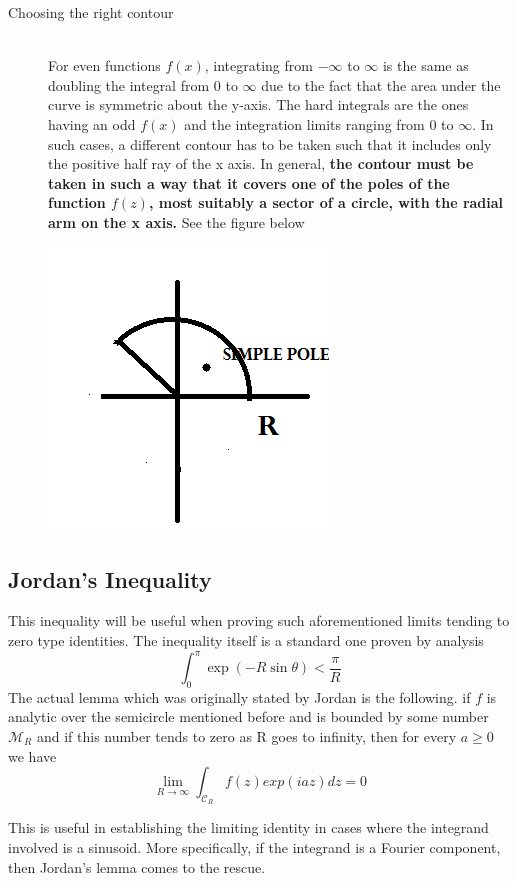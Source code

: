 \documentclass[11pt]{article}
\begin{document}
\begin{sloppypar}
\begin{description}
\item[Choosing the right contour] \hfill \\
	For even functions $f(x)$, integrating from $-\infty$ to $\infty$ is the same as doubling the integral from $0$ to $\infty$ due to the fact that the area under the curve is symmetric about the y-axis. The hard integrals are the ones having an odd $f(x)$ and the integration limits ranging from $0$ to $\infty$. In such cases, a different contour has to be taken such that it includes only the positive half ray of the x axis. In general, \textbf{the contour must be taken in such a way that it covers one of the poles of the function $f(z)$, most suitably a sector of a circle, with the radial arm on the x axis.} See the figure below
	\begin{center}
	\includegraphics[scale=0.6]{arc.png}
	\end{center}
\end{description}

\subsection{Jordan\rq{}s Inequality}
This inequality will be useful when proving such aforementioned limits tending to zero type identities. The inequality itself is a standard one proven by analysis 
$$\int_{0}^{\pi} \exp(-R\sin\theta) < \frac{\pi}{R}$$ The actual lemma which was originally stated by Jordan is the following. if $f$ is analytic over the semicircle mentioned before and is bounded by some number $\mathcal{M}_{R}$ and if this number tends to zero as R goes to infinity, then for every $a\geq 0$ we have 
$$\lim_{R \to \infty} \int_{\mathcal{C}_{R}} f(z)exp(iaz)dz = 0$$

This is useful in establishing the limiting identity in cases where the integrand involved is a sinusoid. More specifically, if the integrand is a Fourier component, then Jordan\rq{}s lemma comes to the rescue.


\end{sloppypar}
\end{document}

